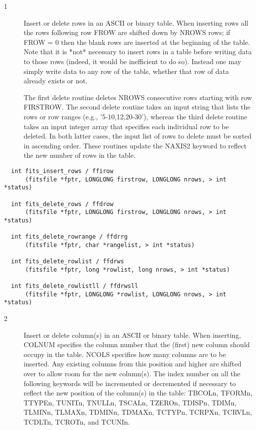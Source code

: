 \documentclass[11pt]{book}
\begin{document}
\begin{description}
\item[1 ] Insert or delete rows in an ASCII or binary table. When inserting rows
    all the rows following row FROW are shifted down by NROWS rows;  if
    FROW = 0 then the blank rows are inserted at the beginning of the
    table.  Note that it is *not* necessary to insert rows in a table before
    writing data to those rows (indeed, it would be inefficient to do so).
    Instead one may simply write data to any row of the table, whether that
    row of data already exists or not.

    The first delete routine deletes NROWS consecutive rows
    starting with row FIRSTROW.  The second delete routine takes an
    input string that lists the rows or row ranges (e.g.,
    '5-10,12,20-30'), whereas the third delete routine takes an input
    integer array that specifies each individual row to be deleted. In
    both latter cases, the input list of rows to delete must be sorted
    in ascending order.  These routines update the NAXIS2 keyword to
    reflect the new number of rows in the
   table. \label{ffirow} \label{ffdrow} \label{ffdrws} \label{ffdrrg}
\end{description}

\begin{verbatim}
  int fits_insert_rows / ffirow
      (fitsfile *fptr, LONGLONG firstrow, LONGLONG nrows, > int *status)

  int fits_delete_rows / ffdrow
      (fitsfile *fptr, LONGLONG firstrow, LONGLONG nrows, > int *status)

  int fits_delete_rowrange / ffdrrg
      (fitsfile *fptr, char *rangelist, > int *status)

  int fits_delete_rowlist / ffdrws
      (fitsfile *fptr, long *rowlist, long nrows, > int *status)

  int fits_delete_rowlistll / ffdrwsll
      (fitsfile *fptr, LONGLONG *rowlist, LONGLONG nrows, > int *status)
\end{verbatim}

\begin{description}
\item[2 ] Insert or delete column(s) in an ASCII or binary
    table.  When inserting, COLNUM specifies the column number that the
    (first) new column should occupy in the table.  NCOLS specifies how
    many columns are to be inserted. Any existing columns from this
    position and higher are shifted over to allow room for the new
    column(s).  The index number on all the following keywords will be
    incremented or decremented if necessary to reflect the new position
    of the column(s) in the table:  TBCOLn, TFORMn, TTYPEn, TUNITn,
    TNULLn, TSCALn, TZEROn, TDISPn, TDIMn, TLMINn, TLMAXn, TDMINn,
    TDMAXn, TCTYPn, TCRPXn, TCRVLn, TCDLTn, TCROTn,
   and TCUNIn. \label{fficol} \label{fficls} \label{ffdcol}
\end{description}
\end{document}
